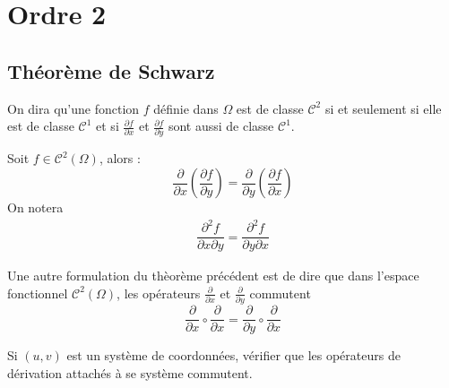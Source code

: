 \section{Ordre 2}
\subsection{Théorème de Schwarz}
\begin{defi}
 On dira qu'une fonction $f$ définie dans $\Omega$ est de classe $\mathcal C^2$ si et seulement si elle est de classe $\mathcal C^1$ et si $\frac{\partial f}{\partial x}$ et $\frac{\partial f}{\partial y}$ sont aussi de classe $\mathcal C^1$.
\end{defi}
\begin{thm}
 Soit $f\in \mathcal C^2(\Omega)$, alors :
\begin{displaymath}
 \dfrac{\partial}{\partial x}\left( \dfrac{\partial f}{\partial y}\right)
=
 \dfrac{\partial}{\partial y}\left( \dfrac{\partial f}{\partial x}\right)
\end{displaymath}
On notera 
\begin{align*}
 \dfrac{\partial^2 f}{\partial x\partial y}
=
 \dfrac{\partial^2 f}{\partial y\partial x} 
\end{align*}
\end{thm}
\begin{rem}
 Une autre formulation du thèorème précédent est de dire que dans l'espace fonctionnel $\mathcal C^2(\Omega)$, les opérateurs $\frac{\partial }{\partial x}$ et $\frac{\partial }{\partial y}$ commutent
\begin{displaymath}
 \frac{\partial }{\partial x} \circ \frac{\partial }{\partial x}=
 \frac{\partial }{\partial y} \circ \frac{\partial }{\partial x}
\end{displaymath}
\end{rem}
Si $(u,v)$ est un système de coordonnées, vérifier que les opérateurs de dérivation attachés à se système commutent.
